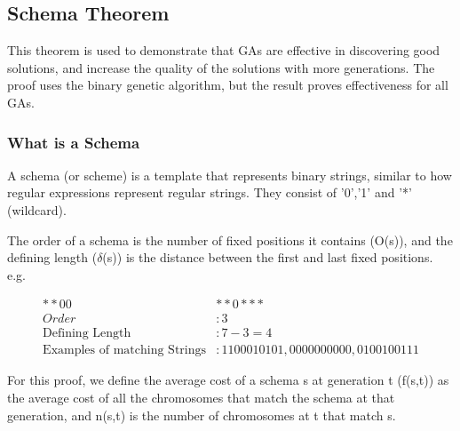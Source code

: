 \subsection{Schema Theorem}
This theorem is used to demonstrate that GAs are effective in discovering good solutions, and increase the quality of the solutions with more generations. The proof uses the binary genetic algorithm, but the result proves effectiveness for all GAs.

\subsubsection{What is a Schema}
A schema (or scheme) is a template that represents binary strings, similar to how regular expressions represent regular strings. They consist of '0','1' and '*' (wildcard).

The order of a schema is the number of fixed positions it contains (O(s)), and the defining length ($\delta$(s)) is the distance between the first and last fixed positions. e.g.

\begin{align}
    **00&**0*** \nonumber \\
    Order&: 3 \nonumber \\
    \text{Defining Length}&: 7-3 = 4  \nonumber \\
    \text{Examples of matching Strings}&: 1100010101, 0000000000, 0100100111 \nonumber
\end{align}

For this proof, we define the average cost of a schema s at  generation t (f(s,t)) as the average cost of all the chromosomes that match the schema at that generation, and n(s,t) is the number of chromosomes at t that match s.

